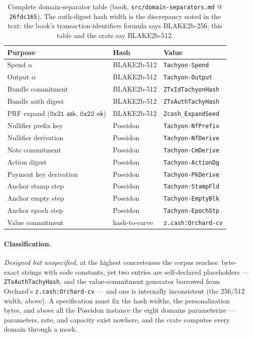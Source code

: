 \documentclass[11pt,a4paper]{article}
\theoremstyle{definition}
\newcommand{\ask}{\ensuremath{\mathsf{ask}}}
\newcommand{\nksym}{\ensuremath{\mathsf{nk}}}
\begin{document}
\begin{table}[htbp]
\centering
\footnotesize
\begin{tabular}{@{}lll@{}}
\toprule
Purpose & Hash & Value \\
\midrule
Spend $\alpha$          & BLAKE2b-512 & \texttt{Tachyon-Spend} \\
Output $\alpha$         & BLAKE2b-512 & \texttt{Tachyon-Output} \\
Bundle commitment       & BLAKE2b-512 & \texttt{ZTxIdTachyonHash} \\
Bundle auth digest      & BLAKE2b-512 & \texttt{ZTxAuthTachyHash} \\
PRF expand ($\mathtt{0x21}$ $\ask$, $\mathtt{0x22}$ $\nksym$)
                        & BLAKE2b-512 & \texttt{Zcash\_ExpandSeed} \\
\midrule
Nullifier prefix key    & Poseidon & \texttt{Tachyon-NfPrefix} \\
Nullifier derivation    & Poseidon & \texttt{Tachyon-NfDerive} \\
Note commitment         & Poseidon & \texttt{Tachyon-CmDerive} \\
Action digest           & Poseidon & \texttt{Tachyon-ActionDg} \\
Payment key derivation  & Poseidon & \texttt{Tachyon-PkDerive} \\
Anchor stamp step       & Poseidon & \texttt{Tachyon-StampFld} \\
Anchor empty step       & Poseidon & \texttt{Tachyon-EmptyBlk} \\
Anchor epoch step       & Poseidon & \texttt{Tachyon-EpochStp} \\
\midrule
Value commitment        & hash-to-curve & \texttt{z.cash:Orchard-cv} \\
\bottomrule
\end{tabular}
\caption{Complete domain-separator table (book,
\texttt{src/domain-separators.md} @ \texttt{26fdc165}). The auth-digest
hash width is the discrepancy noted in the text: the book's
transaction-identifiers formula says BLAKE2b-256; this table and the
crate say BLAKE2b-512.}
\label{tab:tachyon-design-domains}
\end{table}

\paragraph{Classification.} \emph{Designed but unspecified}, at the highest
concreteness the corpus reaches: byte-exact strings with code constants,
yet two entries are self-declared placeholders ---
\texttt{ZTxAuthTachyHash}, and the value-commitment generator borrowed
from Orchard's \texttt{z.cash:Orchard-cv} --- and one is internally
inconsistent (the 256/512 width, above).
A specification must fix the hash widths, the personalization
bytes, and above all the Poseidon instance the eight domains parameterize
--- parameters, rate, and capacity exist nowhere, and the crate computes
every domain through a mock.
\end{document}
